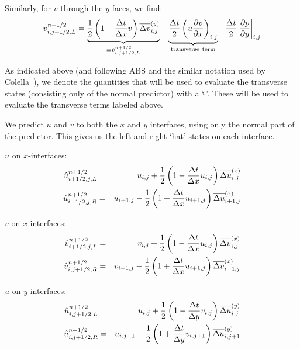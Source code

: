 Similarly, for $v$ through the $y$ faces, we find:
\begin{equation}
v_{i,j+1/2,L}^{n+1/2} 
    = \underbrace{\frac{1}{2} \left ( 1 - \frac{\Delta t}{\Delta x} v \right ) \overline{\Delta v}^{(y)}_{i,j}}_{\equiv \hat{v}_{i,j+1/2,L}^{n+1/2}}
    - \underbrace{\frac{\Delta t}{2} \left ( u \frac{\partial v}{\partial x} \right )_{i,j}}_{\mathrm{transverse~term}}
    - \frac{\Delta t}{2} \left . \frac{\partial p}{\partial y} \right |_{i,j}
\label{eq:vMAC_l}
\end{equation} 

As indicated above (and following ABS and the similar notation used by
Colella~\cite{colella:1990}), we denote the quantities that will be used to evaluate
the transverse states (consisting only of the normal predictor) with a
`$\hat{~}$'.  These will be used to evaluate the transverse terms
labeled above.

We predict $u$ and $v$ to both the $x$ and $y$ interfaces, using only
the normal part of the predictor.  This gives us the left and right `hat'
states on each interface.

\noindent $u$ on $x$-interfaces:
\begin{eqnarray}
\hat{u}_{i+1/2,j,L}^{n+1/2} &=&
   u_{i,j} + \frac{1}{2} \left ( 1 - \frac{\Delta t}{\Delta x} u_{i,j} \right )
       \Dux_{i,j} \\ 
%
\hat{u}_{i+1/2,j,R}^{n+1/2} &=&
   u_{i+1,j} - \frac{1}{2} \left ( 1 + \frac{\Delta t}{\Delta x} u_{i+1,j} \right )
       \Dux_{i+1,j} 
\end{eqnarray}

\noindent $v$ on $x$-interfaces:
\begin{eqnarray}
\hat{v}_{i+1/2,j,L}^{n+1/2} &=&
   v_{i,j} + \frac{1}{2} \left ( 1 - \frac{\Delta t}{\Delta x} u_{i,j} \right )
       \Dvx_{i,j} \\ 
%
\hat{v}_{i,j+1/2,R}^{n+1/2} &=&
   v_{i+1,j} - \frac{1}{2} \left ( 1 + \frac{\Delta t}{\Delta x} u_{i+1,j} \right )
       \Dvx_{i+1,j} 
\end{eqnarray}

\noindent $u$ on $y$-interfaces:
\begin{eqnarray}
\hat{u}_{i,j+1/2,L}^{n+1/2} &=&
   u_{i,j} + \frac{1}{2} \left ( 1 - \frac{\Delta t}{\Delta y} v_{i,j} \right )
       \Duy_{i,j} \\ 
%
\hat{u}_{i,j+1/2,R}^{n+1/2} &=&
   u_{i,j+1} - \frac{1}{2} \left ( 1 + \frac{\Delta t}{\Delta y} v_{i,j+1} \right )
       \Duy_{i,j+1} 
\end{eqnarray}

